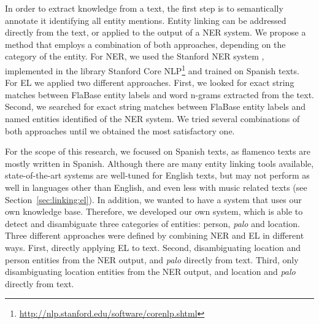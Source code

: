In order to extract knowledge from a text, the first step is to semantically annotate it identifying all entity mentions. %
Entity linking can be addressed directly from the text, or applied to the output of a NER system. We propose a method that employs a combination of both approaches, depending on the category of the entity. For NER, we used the Stanford NER system \citep{Finkel2005}, implemented in the library Stanford Core NLP\footnote{\url{http://nlp.stanford.edu/software/corenlp.shtml}} and trained on Spanish texts. For EL we applied two different approaches. First, we looked for exact string matches between FlaBase entity labels and word n-grams extracted from the text. Second, we searched for exact string matches between FlaBase entity labels and named entities identified of the NER system. We tried several combinations of both approaches until we obtained the most satisfactory one.

For the scope of this research, we focused on Spanish texts, as flamenco texts are mostly written in Spanish. Although there are many entity linking tools available, state-of-the-art systems are well-tuned for English texts, but may not perform as well in languages other than English, and even less with music related texts (see Section~\ref{sec:linking:el}). In addition, we wanted to have a system that uses our own knowledge base. Therefore, we developed our own system, which is able to detect and disambiguate three categories of entities: person, \textit{palo} and location. Three different approaches were defined by combining NER and EL in different ways. First, directly applying EL to text. Second, disambiguating location and person entities from the NER output, and \textit{palo} directly from text. Third, only disambiguating location entities from the NER output, and location and \textit{palo} directly from text.

